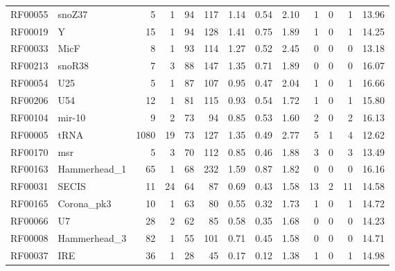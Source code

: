 \begin{table}
\begin{center}
\begin{tabular}{|ll|rr|rr|r|rr|rrrr|}
RF00055 & snoZ37          &     5 &     1 &    94 & 117 &   1.14 &   0.54 &   2.10 &   1 &  0 &  1 &  13.96 \\
RF00019 & Y               &    15 &     1 &    94 & 128 &   1.41 &   0.75 &   1.89 &   1 &  0 &  1 &  14.25 \\
RF00033 & MicF            &     8 &     1 &    93 & 114 &   1.27 &   0.52 &   2.45 &   0 &  0 &  0 &  13.18 \\
RF00213 & snoR38          &     7 &     3 &    88 & 147 &   1.35 &   0.71 &   1.89 &   0 &  0 &  0 &  16.07 \\
RF00054 & U25             &     5 &     1 &    87 & 107 &   0.95 &   0.47 &   2.04 &   1 &  0 &  1 &  16.66 \\
RF00206 & U54             &    12 &     1 &    81 & 115 &   0.93 &   0.54 &   1.72 &   1 &  0 &  1 &  15.80 \\
RF00104 & mir-10          &     9 &     2 &    73 &  94 &   0.85 &   0.53 &   1.60 &   2 &  0 &  2 &  16.13 \\
RF00005 & tRNA            &  1080 &    19 &    73 & 127 &   1.35 &   0.49 &   2.77 &   5 &  1 &  4 &  12.62 \\
RF00170 & msr             &     5 &     3 &    70 & 112 &   0.85 &   0.46 &   1.88 &   3 &  0 &  3 &  13.49 \\
RF00163 & Hammerhead\_1   &    65 &     1 &    68 & 232 &   1.59 &   0.87 &   1.82 &   0 &  0 &  0 &  16.16 \\
RF00031 & SECIS           &    11 &    24 &    64 &  87 &   0.69 &   0.43 &   1.58 &  13 &  2 & 11 &  14.58 \\
RF00165 & Corona\_pk3     &    10 &     1 &    63 &  80 &   0.55 &   0.32 &   1.73 &   1 &  0 &  1 &  14.72 \\
RF00066 & U7              &    28 &     2 &    62 &  85 &   0.58 &   0.35 &   1.68 &   0 &  0 &  0 &  14.23 \\
RF00008 & Hammerhead\_3   &    82 &     1 &    55 & 101 &   0.71 &   0.45 &   1.58 &   0 &  0 &  0 &  14.71 \\
RF00037 & IRE             &    36 &     1 &    28 &  45 &   0.17 &   0.12 &   1.38 &   1 &  0 &  1 &  14.98 \\ \hline

\end{tabular}
\end{center}
\end{table}
